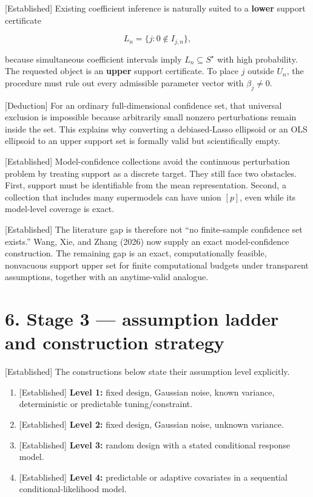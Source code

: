 \documentclass[
  english,
  11pt,
  a4paper,
]{article}
\providecommand{\tightlist}{%
  \setlength{\itemsep}{0pt}\setlength{\parskip}{0pt}}
\begin{document}
{[}Established{]} Existing coefficient inference is naturally suited to
a \textbf{lower} support certificate

$$
L_n=\{j:0\notin I_{j,n}\},
$$

because simultaneous coefficient intervals imply
$L_n\subseteq S^\star$ with high probability. The requested object is
an \textbf{upper} support certificate. To place $j$ outside $U_n$,
the procedure must rule out every admissible parameter vector with
$\beta_j\ne0$.

{[}Deduction{]} For an ordinary full-dimensional confidence set, that
universal exclusion is impossible because arbitrarily small nonzero
perturbations remain inside the set. This explains why converting a
debiased-Lasso ellipsoid or an OLS ellipsoid to an upper support set is
formally valid but scientifically empty.

{[}Established{]} Model-confidence collections avoid the continuous
perturbation problem by treating support as a discrete target. They
still face two obstacles. First, support must be identifiable from the
mean representation. Second, a collection that includes many supermodels
can have union $[p]$, even while its model-level coverage is exact.

{[}Established{]} The literature gap is therefore not ``no finite-sample
confidence set exists.'' Wang, Xie, and Zhang (2026) now supply an exact
model-confidence construction. The remaining gap is an exact,
computationally feasible, nonvacuous support upper set for finite
computational budgets under transparent assumptions, together with an
anytime-valid analogue.

\section{6. Stage 3 --- assumption ladder and construction
strategy}\label{stage-3-assumption-ladder-and-construction-strategy}

{[}Established{]} The constructions below state their assumption level
explicitly.

\begin{enumerate}
\def\labelenumi{\arabic{enumi}.}
\tightlist
\item
  {[}Established{]} \textbf{Level 1:} fixed design, Gaussian noise,
  known variance, deterministic or predictable tuning/constraint.
\item
  {[}Established{]} \textbf{Level 2:} fixed design, Gaussian noise,
  unknown variance.
\item
  {[}Established{]} \textbf{Level 3:} random design with a stated
  conditional response model.
\item
  {[}Established{]} \textbf{Level 4:} predictable or adaptive covariates
  in a sequential conditional-likelihood model.
\end{enumerate}
\end{document}
